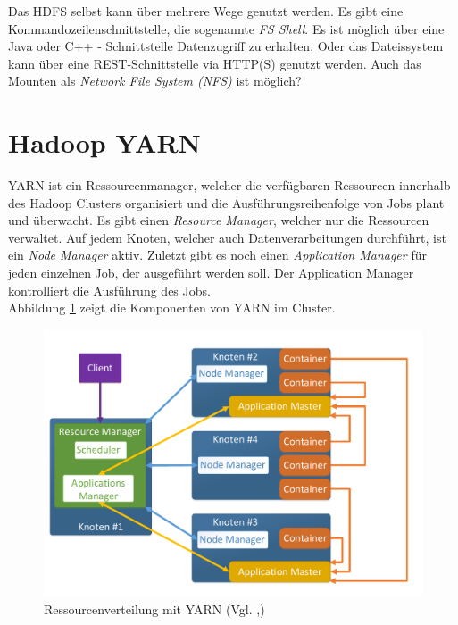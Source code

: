 \noindent
Das HDFS selbst kann über mehrere Wege genutzt werden. Es gibt eine Kommandozeilenschnittstelle, die sogenannte \textit{FS Shell}. Es ist möglich über eine Java oder C++ - Schnittstelle Datenzugriff zu erhalten. Oder das Dateissystem kann über eine REST-Schnittstelle via HTTP(S) genutzt werden. Auch das Mounten als \textit{Network File System (NFS)} ist möglich?

\section{Hadoop YARN}
\label{sec:theory_yarn}
YARN ist ein Ressourcenmanager, welcher die verfügbaren Ressourcen innerhalb des Hadoop Clusters organisiert und die Ausführungsreihenfolge von Jobs plant und überwacht. Es gibt einen \textit{Resource Manager}, welcher nur die Ressourcen verwaltet. Auf jedem Knoten, welcher auch Datenverarbeitungen durchführt, ist ein \textit{Node Manager} aktiv. Zuletzt gibt es noch einen \textit{Application Manager} für jeden einzelnen Job, der ausgeführt werden soll. Der Application Manager kontrolliert die Ausführung des Jobs.\\
Abbildung \ref{fig:yarn_cluster_architecture} zeigt die Komponenten von YARN im Cluster.\\

\begin{figure}[ht]
  \centering
  \includegraphics[width=\textwidth]{./resource/yarn_cluster_architecture.pdf}
  \caption{Ressourcenverteilung mit YARN (Vgl. \cite{yarn_architecture},\cite{expert_hadoop_admin})}
  \label{fig:yarn_cluster_architecture}
\end{figure}

